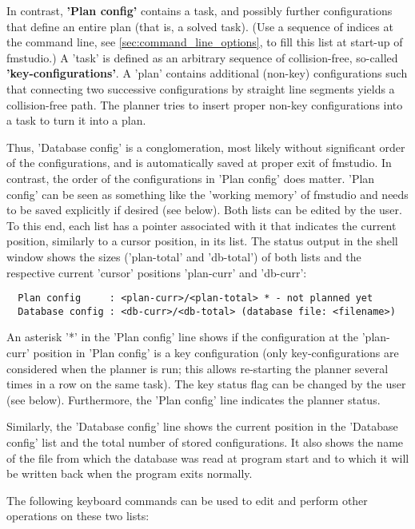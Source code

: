 \documentclass[letter,12pt]{article}
\begin{document}
In contrast, {\bf 'Plan config'} contains a task, and possibly further
configurations that define an entire plan (that is, a solved task).
(Use a sequence of indices at the command line, see
\ref{sec:command_line_options}, to fill this list at start-up of
fmstudio.)  A 'task' is defined as an arbitrary sequence of
collision-free, so-called {\bf 'key-configurations'}.  A 'plan'
contains additional (non-key) configurations such that connecting two
successive configurations by straight line segments yields a
collision-free path.  The planner tries to insert proper non-key
configurations into a task to turn it into a plan.

Thus, 'Database config' is a conglomeration, most likely without
significant order of the configurations, and is automatically saved at
proper exit of fmstudio.  In contrast, the order of the configurations
in 'Plan config' does matter.  'Plan config' can be seen as something
like the 'working memory' of fmstudio and needs to be saved explicitly
if desired (see below).  Both lists can be edited by the user.  To
this end, each list has a pointer associated with it that indicates
the current position, similarly to a cursor position, in its list.
The status output in the shell window shows the sizes ('plan-total'
and 'db-total') of both lists and the respective current 'cursor'
positions 'plan-curr' and 'db-curr':

\begin{verbatim}
  Plan config     : <plan-curr>/<plan-total> * - not planned yet
  Database config : <db-curr>/<db-total> (database file: <filename>)
\end{verbatim}

An asterisk '*' in the 'Plan config' line shows if the configuration
at the 'plan-curr' position in 'Plan config' is a key configuration
(only key-configurations are considered when the planner is run; this
allows re-starting the planner several times in a row on the same
task).  The key status flag can be changed by the user (see below).
Furthermore, the 'Plan config' line indicates the planner status.

Similarly, the 'Database config' line shows the current position in
the 'Database config' list and the total number of stored
configurations.  It also shows the name of the file from which the
database was read at program start and to which it will be written
back when the program exits normally.

The following keyboard commands can be used to edit and perform other
operations on these two lists:
\end{document}
